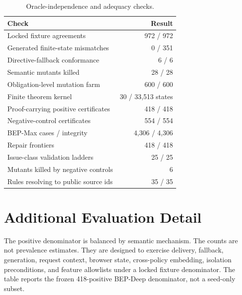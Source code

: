 \documentclass[10pt,conference]{IEEEtran}
\begin{document}
\begin{table}[t]
\centering
\caption{Oracle-independence and adequacy checks.}
\label{tab:supp-oracle-adequacy}
\begin{tabular}{lr}
\toprule
Check & Result \\
\midrule
Locked fixture agreements & 972 / 972 \\
Generated finite-state mismatches & 0 / 351 \\
Directive-fallback conformance & 6 / 6 \\
Semantic mutants killed & 28 / 28 \\
Obligation-level mutation farm & 600 / 600 \\
Finite theorem kernel & 30 / 33,513 states \\
Proof-carrying positive certificates & 418 / 418 \\
Negative-control certificates & 554 / 554 \\
BEP-Max cases / integrity & 4,306 / 4,306 \\
Repair frontiers & 418 / 418 \\
Issue-class validation ladders & 25 / 25 \\
Mutants killed by negative controls & 6 \\
Rules resolving to public source ids & 35 / 35 \\
\bottomrule
\end{tabular}
\end{table}

\section{Additional Evaluation Detail}

The positive denominator is balanced by semantic mechanism. The counts are not prevalence estimates. They are designed to exercise delivery, fallback, generation, request context, browser state, cross-policy embedding, isolation preconditions, and feature allowlists under a locked fixture denominator. The table reports the frozen 418-positive BEP-Deep denominator, not a seed-only subset.
\end{document}
